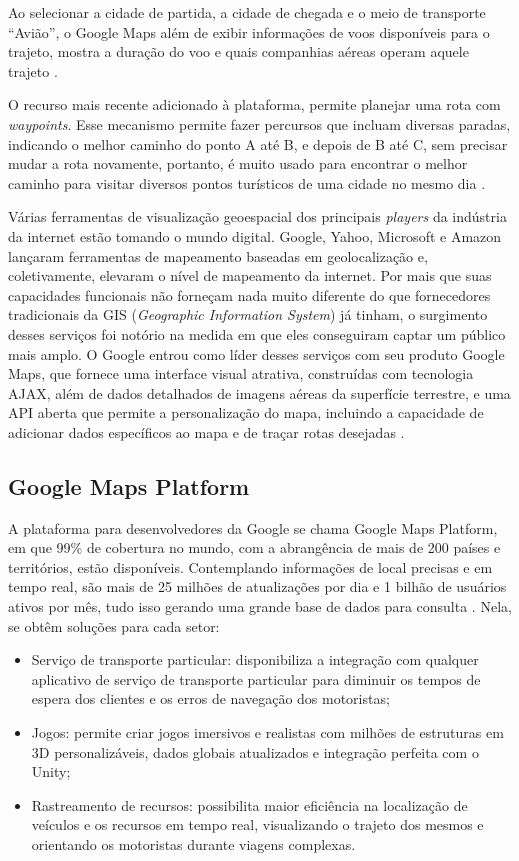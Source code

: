Ao selecionar a cidade de partida, a cidade de chegada e o meio de transporte “Avião”, o Google Maps além de exibir informações de voos disponíveis para o trajeto, mostra a duração do voo e quais companhias aéreas operam aquele trajeto \cite{google:2019}. 

O recurso mais recente adicionado à plataforma, permite planejar uma rota com \textit{waypoints}. Esse mecanismo permite fazer percursos que incluam diversas paradas, indicando o melhor caminho do ponto A até B, e depois de B até C, sem precisar mudar a rota novamente, portanto, é muito usado para encontrar o melhor caminho para visitar diversos pontos turísticos de uma cidade no mesmo dia \cite{google:2019}.

Várias ferramentas de visualização geoespacial dos principais \textit{players} da indústria da internet estão tomando o mundo digital. Google, Yahoo, Microsoft e Amazon lançaram ferramentas de mapeamento baseadas em geolocalização e, coletivamente, elevaram o nível de mapeamento da internet. Por mais que suas capacidades funcionais não forneçam nada muito diferente do que fornecedores tradicionais da GIS (\textit{Geographic Information System}) já tinham, o surgimento desses serviços foi notório na medida em que eles conseguiram captar um público mais amplo. O Google entrou como líder desses serviços com seu produto Google Maps, que fornece uma interface visual atrativa, construídas com tecnologia AJAX, além de dados detalhados de imagens aéreas da superfície terrestre, e uma API aberta que permite a personalização do mapa, incluindo a capacidade de adicionar dados específicos ao mapa e de traçar rotas desejadas \cite{geospatial:2009}.

\newpage
\subsection{Google Maps Platform}

A plataforma para desenvolvedores da Google se chama Google Maps Platform, em que 99\% de cobertura no mundo, com a abrangência de mais de 200 países e territórios, estão disponíveis. Contemplando informações de local precisas e em tempo real, são mais de 25 milhões de atualizações por dia e 1 bilhão de usuários ativos por mês, tudo isso gerando uma grande base de dados para consulta \cite{google:2019}. Nela, se obtêm soluções para cada setor:
\begin{itemize}
    \item Serviço de transporte particular: disponibiliza a integração com qualquer aplicativo de serviço de transporte particular para diminuir os tempos de espera dos clientes e os erros de navegação dos motoristas;
    \item Jogos: permite criar jogos imersivos e realistas com milhões de estruturas em 3D personalizáveis, dados globais atualizados e integração perfeita com o Unity;
    \item Rastreamento de recursos: possibilita maior eficiência na localização de veículos e os recursos em tempo real, visualizando o trajeto dos mesmos e orientando os motoristas durante viagens complexas. 
\end{itemize}

